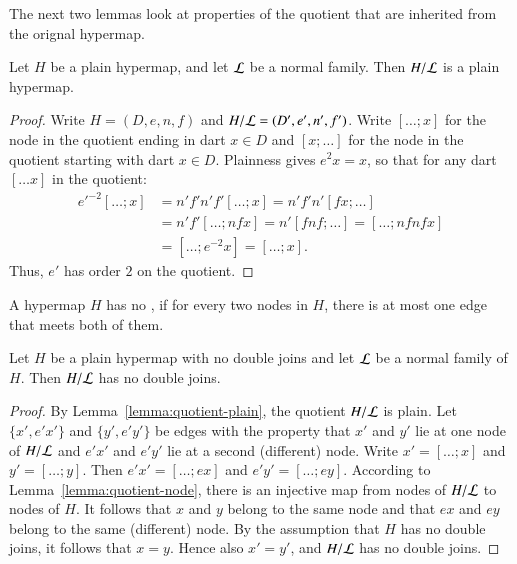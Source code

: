 The next two lemmas look at properties of the quotient that are
inherited from the orignal hypermap.

\begin{lemma}\label{lemma:quotient-plain}
Let $H$ be a plain hypermap, and let $\cal L$ be a
normal family.  Then $H/{\cal L}$ is a plain hypermap.
\end{lemma}

\begin{proof}  Write $H=(D,e,n,f)$ and $H/{\cal L} = (D',e',n',f')$.  
Write $[\ldots; x]$ for the node in
the quotient ending in dart $x\in D$ and $[x;\ldots]$ for the node
in the quotient starting with dart $x\in D$.  Plainness gives $e^2 x
= x$, so that for any dart $[\ldots x]$ in the quotient:
\begin{displaymath}\begin{array}{lll}
{e'}^{-2} [\ldots; x] &= n' f' n' f' [\ldots; x] = n' f' n' [f x; \ldots] \\&=
n' f' [\ldots; n f x] = n' [f n f; \ldots] = [\ldots; n f n f x]\\ &=
[\ldots; e^{-2} x] = [\ldots; x].
\end{array}\end{displaymath}
Thus, $e'$ has order $2$ on the quotient.
\end{proof}




\begin{definition}
A hypermap $H$ has no , if for every two nodes
in $H$, there is at most one edge that meets both of them.
\end{definition}


\begin{lemma}
Let $H$ be a plain hypermap with no double joins and let ${\cal L}$ be a normal
family of $H$.  Then $H/{\cal L}$ has no double joins.
\end{lemma}

\begin{proof} By Lemma~\ref{lemma:quotient-plain}, the quotient
  $H/{\cal L}$ is plain.  Let $\{x',e'x'\}$ and $\{y',e'y'\}$ be edges
  with the property that $x'$ and $y'$ lie at one node of $H/{\cal L}$
  and $e'x'$ and $e'y'$ lie at a second (different) node.  Write $x' =
  [\ldots;x]$ and $y' = [\ldots;y]$.  Then $e'x' = [\ldots;e x]$ and
  $e'y' = [\ldots;e y]$.  According to
  Lemma~\ref{lemma:quotient-node}, there is an injective map from
  nodes of $H/{\cal L}$ to nodes of $H$.  It follows that $x$ and $y$
  belong to the same node and that $e x$ and $e y$ belong to the same
  (different) node.  By the assumption that $H$ has no double joins,
  it follows that $x=y$.  Hence also $x' = y'$, and $H/{\cal L}$ has
  no double joins.
\end{proof}


